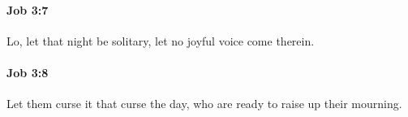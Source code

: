 		\paragraph{Job 3:7} %
			\label{JOB-3-7}

			Lo, let that night be solitary, let no joyful voice come therein.


		\paragraph{Job 3:8} %
			\label{JOB-3-8}

			Let them curse it that curse the day, who are ready to raise up their mourning.



